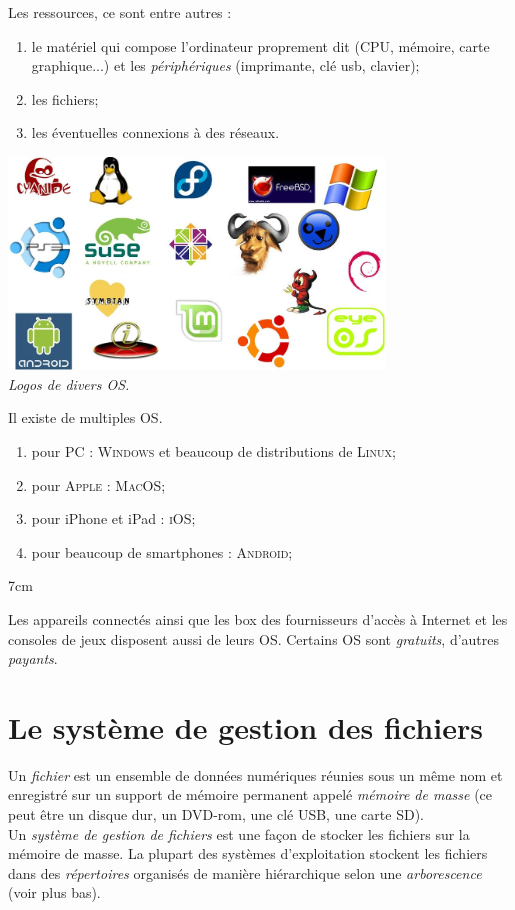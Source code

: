 \documentclass[a4paper,12pt,french]{book}
\begin{document}
	Les ressources, ce sont entre autres : 
	\begin{enumerate}[--]
		\item 	le matériel qui compose l'ordinateur proprement dit (CPU, mémoire, carte graphique...) et les \textit{périphériques} (imprimante, clé usb, clavier);
		\item 	les fichiers;
		\item 	les éventuelles connexions à des réseaux.
	\end{enumerate}
	\double
	{
		\begin{center}
			\includegraphics[width=10cm]{oss.png}\\
			\footnotesize\textit{ Logos de divers OS.}
		\end{center}

	}
	{
		Il existe de multiples OS.
		\begin{enumerate}[--]
			\item 	pour PC : \textsc{Windows} et beaucoup de distributions de \textsc{Linux};
			\item 	pour \textsc{Apple} : \textsc{MacOS};
			\item	pour iPhone et iPad : \textsc{iOS};
			\item 	pour beaucoup de smartphones : \textsc{Android};
		\end{enumerate}
	}{7cm}

	Les appareils connectés ainsi que les \og box \fg{} des fournisseurs d'accès à Internet et les consoles de jeux disposent aussi de leurs OS.
	Certains OS sont \textit{gratuits}, d'autres \textit{payants}.
	
	\section*{Le système de gestion des fichiers}
	
	Un \textit{fichier} est un ensemble de données numériques réunies sous un même nom et enregistré sur un support de mémoire permanent appelé \textit{mémoire de masse} (ce peut être un disque dur, un DVD-rom, une clé USB, une carte SD).\\
	Un \textit{système de gestion de fichiers} est une façon de stocker les fichiers sur la mémoire de masse. La plupart des systèmes d'exploitation stockent les fichiers dans des \textit{répertoires} organisés de manière hiérarchique selon une \textit{arborescence} (voir plus bas).
\end{document}
